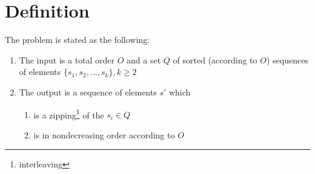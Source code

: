 \section{Definition}
\label{tree:merging:def}

The problem is stated as the following:

\begin{enumerate}
\item The input is a total order $O$ and a set $Q$ of sorted (according to $O$) sequences of elements $\{s_1, s_2, \dots, s_k\}, k \geq 2$
\item The output is a sequence of elements $s'$ which
	\begin{enumerate}
	\item is a zipping\footnote{interleaving} of the $s_i \in Q$
	\item is in nondecreasing order according to $O$
	\end{enumerate}
\end{enumerate}

